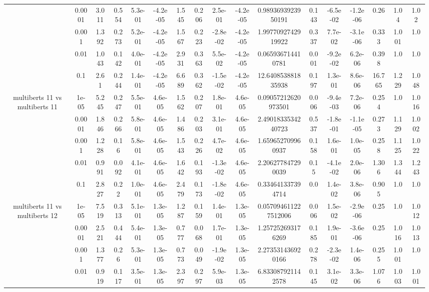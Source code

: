 \begin{tabular}{|c|c|c|c|c|c|c|c|c|c|c|c|c|c|c|c|c|}
 & 0.0001 & 3.011 & 0.554 & 5.3e-01 & -4.2e-05 & 1.545 & 0.206 & 2.5e-01 & -4.2e-05 & 0.9893693923950191 & 0.143 & -6.5e-02 & -1.2e-06 & 0.26 & 1.04 & 1.02 \\
 & 0.001 & 1.392 & 0.273 & 5.2e-01 & -4.2e-05 & 1.567 & 0.223 & -2.8e-02 & -4.2e-05 & 1.9977092742919922 & 0.337 & 7.7e-02 & -3.1e-06 & 0.333 & 1.001 & 1.0 \\
 & 0.01 & 1.043 & 0.142 & 4.0e-01 & -4.2e-05 & 2.931 & 0.363 & 5.5e-02 & -4.2e-05 & 0.065936714410781 & 0.001 & -9.2e-02 & 6.2e-06 & 0.398 & 1.0 & 1.0 \\
 & 0.1 & 2.61 & 0.244 & 1.4e-01 & -4.2e-05 & 6.689 & 0.362 & -1.5e-02 & -4.2e-05 & 12.640853881835938 & 0.197 & 1.3e-01 & 8.6e-06 & 16.765 & 1.229 & 1.048 \\
\hline
\multirow{5}{*}{multiberts 11 vs multiberts 11} & 1e-05 & 5.245 & 0.247 & 5.5e-01 & 4.6e-05 & 1.562 & 0.207 & 1.8e-01 & 4.6e-05 & 0.09057212620973501 & 0.006 & -9.4e-03 & 7.2e-06 & 0.254 & 1.0 & 1.016 \\
 & 0.0001 & 1.846 & 0.266 & 5.8e-01 & 4.6e-05 & 1.486 & 0.203 & 3.1e-01 & 4.6e-05 & 2.4901833534240723 & 0.537 & -1.8e-01 & -1.1e-05 & 0.273 & 1.129 & 1.002 \\
 & 0.001 & 1.228 & 0.16 & 5.8e-01 & 4.6e-05 & 1.543 & 0.226 & 4.7e-02 & 4.6e-05 & 1.659652709960937 & 0.158 & 1.6e-01 & 1.0e-05 & 0.258 & 1.125 & 1.022 \\
 & 0.01 & 0.991 & 0.092 & 4.1e-01 & 4.6e-05 & 1.642 & 0.193 & -1.3e-02 & 4.6e-05 & 2.206277847290039 & 0.15 & -4.1e-02 & 2.0e-06 & 1.306 & 1.344 & 1.243 \\
 & 0.1 & 2.827 & 0.22 & 1.0e-01 & 4.6e-05 & 2.479 & 0.173 & -1.8e-02 & 4.6e-05 & 0.334641337394714 & 0.0 & 1.4e-02 & 3.8e-06 & 0.905 & 1.0 & 1.0 \\
\hline
\multirow{5}{*}{multiberts 11 vs multiberts 12} & 1e-05 & 7.519 & 0.313 & 5.1e-01 & 1.3e-05 & 1.287 & 0.159 & 1.4e-01 & 1.3e-05 & 0.057094611227512006 & 0.006 & 1.5e-02 & -2.9e-06 & 0.25 & 1.0 & 1.012 \\
 & 0.0001 & 2.521 & 0.444 & 5.4e-01 & 1.3e-05 & 0.777 & 0.068 & 1.7e-01 & 1.3e-05 & 1.257252693176269 & 0.185 & 1.9e-01 & -3.6e-06 & 0.25 & 1.016 & 1.013 \\
 & 0.001 & 1.377 & 0.26 & 5.3e-01 & 1.3e-05 & 0.773 & 0.049 & -1.9e-02 & 1.3e-05 & 2.273531436920166 & 0.278 & -2.3e-02 & 1.4e-06 & 0.255 & 1.001 & 1.0 \\
 & 0.01 & 0.919 & 0.117 & 3.5e-01 & 1.3e-05 & 2.397 & 0.297 & 5.9e-03 & 1.3e-05 & 6.833087921142578 & 0.145 & 3.1e-02 & 3.3e-06 & 1.076 & 1.003 & 1.001 \\

\end{tabular}
